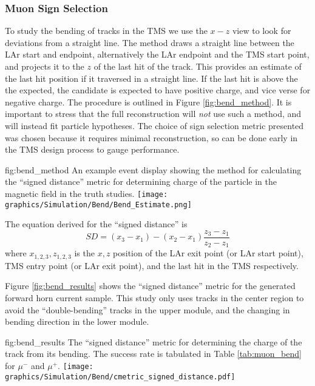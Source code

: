 \subsubsection{Muon Sign Selection}

To study the bending of tracks in the TMS we use the $x-z$ view to look for deviations from a straight line. The method draws a straight line between the LAr start and endpoint, alternatively the LAr endpoint and the TMS start point, and projects it to the $z$ of the last hit of the track. This provides an estimate of the last hit position if it traversed in a straight line. If the last hit is above the the expected, the candidate is expected to have positive charge, and vice verse for negative charge. The procedure is outlined in Figure \ref{fig:bend_method}. It is important to stress that the full reconstruction will \emph{not} use such a method, and will instead fit particle hypotheses. The choice of sign selection metric presented was chosen because it requires minimal reconstruction, so can be done early in the TMS design process to gauge performance.
\begin{dunefigure}[]{fig:bend_method}
{An example event display showing the method for calculating the ``signed distance'' metric for determining charge of the particle in the magnetic field in the truth studies.}
\texttt{[image: graphics/Simulation/Bend/Bend\_Estimate.png]}
\end{dunefigure}

The equation derived for the ``signed distance'' is
\begin{equation}
    SD = (x_3-x_1) - (x_2-x_1)\frac{z_3-z_1}{z_2-z_1}
\end{equation}
where $x_{1,2,3},z_{1,2,3}$ is the $x,z$ position of the LAr exit point (or LAr start point), TMS entry point (or LAr exit point), and the last hit in the TMS respectively.

Figure \ref{fig:bend_results} shows the ``signed distance'' metric for the generated forward horn current sample. This study only uses tracks in the center region to avoid the ``double-bending'' tracks in the upper module, and the changing in bending direction in the lower module.

\begin{dunefigure}[]{fig:bend_results}
{The ``signed distance'' metric for determining the charge of the track from its bending. The success rate is tabulated in 
Table \ref{tab:muon_bend} for $\mu^-$ and $\mu^+$.}
\texttt{[image: graphics/Simulation/Bend/cmetric\_signed\_distance.pdf]}
\end{dunefigure}


